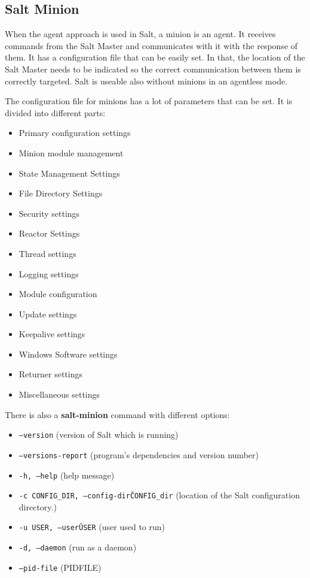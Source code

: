 \documentclass[12pt,a4paper,openright,twoside]{book}
\begin{document}
\subsection{Salt Minion}
When the agent approach is used in Salt, a minion is an agent. It receives commands from the Salt Master and communicates with it with the response of them. It has a configuration file that can be easily set. In that, the location of the Salt Master needs to be indicated so the correct communication between them is correctly targeted.
Salt is useable also without minions in an agentless mode.


The configuration file for minions has a lot of parameters that can be set.
It is divided into different parts:
\begin{itemize}
    \item Primary configuration settings
    \item Minion module management
    \item State Management Settings
    \item File Directory Settings
    \item Security settings
    \item Reactor Settings
    \item Thread settings
    \item Logging settings
    \item Module configuration
    \item Update settings
    \item Keepalive settings
    \item Windows Software settings
    \item Returner settings
    \item Miscellaneous settings
\end{itemize}

There is also a \textbf{salt-minion} command with different options:

\begin{itemize}
    \item \texttt{--version} (version of Salt which is running)
    \item \texttt{--versions-report} (program's dependencies and version number)
    \item \texttt{-h, --help} (help message)
    \item \texttt{-c CONFIG\_DIR, --config-dir\=CONFIG\_dir} (location of the Salt configuration directory.)
    \item \texttt{-u USER, --user\=USER} (user used to run)
    \item \texttt{-d, --daemon} (run as a daemon)
    \item \texttt{--pid-file} (PIDFILE)
\end{itemize}
\end{document}
